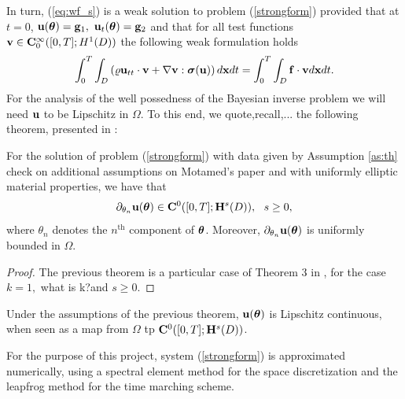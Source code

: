 In turn, (\ref{eq:wf_s}) is a weak solution to problem (\ref{strongform}) provided that at $t=0$, $\uu(\te)=\mathbf{g}_1,\ \uu_t(\te)=\mathbf{g}_2$ and that for all test functions $\mathbf{v}\in \mathbf{C}_0^\infty([0,T];H^1(D))$ the following weak formulation holds \begin{eqnarray}
\int_0^T\int_{D}\left(\varrho \mathbf{u}_{tt}\cdot\mathbf{v}+\nabla\mathbf{v}:\bm{\sigma}(\mathbf{u})\right)d\mathbf{x} dt=\int_0^T\int_{ D}\mathbf{f}\cdot\mathbf{v} d\mathbf{x} dt.
\end{eqnarray}
For the analysis of the well possedness of the Bayesian inverse problem we will need $\mathbf{u}$ to be Lipschitz in $\Omega$. To this end, we \color{red} quote,recall,...\color{black} the following theorem, presented in \cite{motamed2015analysis}:
\begin{theorem}\label{thm:lips} For the solution of problem (\ref{strongform}) with data given by Assumption \ref{as:th}  \color{red} check on additional assumptions on Motamed's paper \color{black} and with uniformly elliptic material properties,  we have that
	\begin{equation}
	\partial_{\theta_n}\mathbf{u}(\bm{\theta})\in\mathbf{C}^0([0,T];\mathbf{H}^{s}(D)), \ \ s\geq 0,
	\end{equation}
	where $\theta_n$ denotes the $n^\text{th}$ component of $\bm{\theta}$. Moreover, $	\partial_{\theta_n}\mathbf{u}(\bm{\theta})$ is uniformly bounded in $\Omega$.
\end{theorem}
\begin{proof}
	The previous theorem is a particular case of Theorem 3 in \cite{motamed2015analysis}, for the case $k=1, $  \color{red} what is k?\color{black}and $s\geq 0$. 
\end{proof}
\begin{corollary}
	Under the assumptions of the previous theorem, $\mathbf{u}(\bm{\theta})$ is Lipschitz continuous, when seen as a map from $\Omega$ tp $\mathbf{C}^0([0,T];\mathbf{H}^{s}(D))$.
\end{corollary}
\noindent For the purpose of this project, system (\ref{strongform}) is approximated numerically, using a spectral element method for the space discretization and the leapfrog method for the time marching scheme. 
